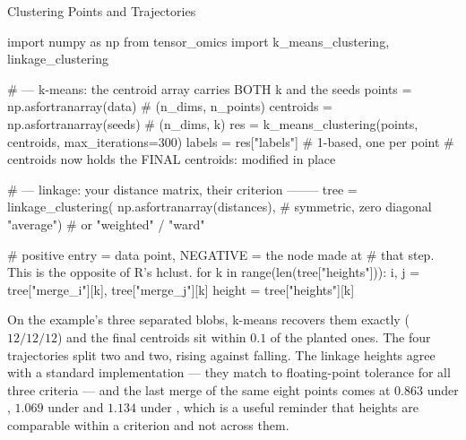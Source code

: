 \begin{recipe}[label=sub:clustering]{Clustering Points and Trajectories}

\begin{codefragment}[language=Python,caption={Fragments to edit: k and its seeds, and the linkage criterion}]
import numpy as np
from tensor_omics import k_means_clustering, linkage_clustering

# --- k-means: the centroid array carries BOTH k and the seeds
points = np.asfortranarray(data)      # (n_dims, n_points)
centroids = np.asfortranarray(seeds)  # (n_dims, k)
res = k_means_clustering(points, centroids, max_iterations=300)
labels = res["labels"]                # 1-based, one per point
# centroids now holds the FINAL centroids: modified in place

# --- linkage: your distance matrix, their criterion --------
tree = linkage_clustering(
    np.asfortranarray(distances),     # symmetric, zero diagonal
    "average")                        # or "weighted" / "ward"

# positive entry = data point, NEGATIVE = the node made at
# that step. This is the opposite of R's hclust.
for k in range(len(tree["heights"])):
    i, j = tree["merge_i"][k], tree["merge_j"][k]
    height = tree["heights"][k]
\end{codefragment}

\begin{parameters}
\end{parameters}

\begin{expectedresults}
  On the example's three separated blobs, k-means recovers them exactly
  ($12/12/12$) and the final centroids sit within $0.1$ of the planted ones.
  The four trajectories split two and two, rising against falling. The linkage
  heights agree with a standard implementation --- they match
   to floating-point tolerance for all
  three criteria --- and the last merge of the same eight points comes at
  $0.863$ under , $1.069$ under  and $1.134$ under
  , which is a useful reminder that heights are comparable within a
  criterion and not across them.
\end{expectedresults}


\end{recipe}
